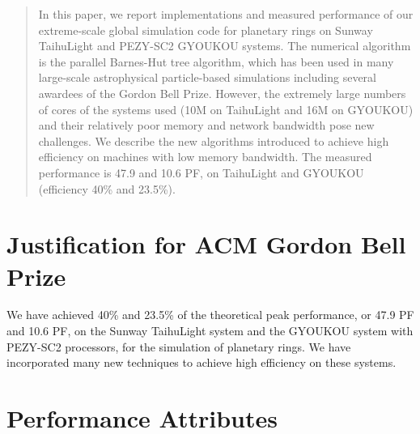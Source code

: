 \documentclass[conference]{IEEEtran}
\begin{document}
\maketitle

\begin{abstract}
  In this paper, we report implementations and measured performance
  of our extreme-scale global simulation code for planetary rings on
  Sunway TaihuLight and PEZY-SC2 GYOUKOU systems.
  The numerical algorithm is the parallel Barnes-Hut tree algorithm,
  which has been used in many large-scale astrophysical particle-based
  simulations including several awardees of the Gordon Bell
  Prize. However, the extremely large numbers of cores of the systems
  used (10M on TaihuLight and 16M on GYOUKOU)  and their relatively poor
  memory and network bandwidth pose new challenges. We describe the
  new algorithms introduced to achieve high efficiency on machines
  with low memory bandwidth.  The measured
  performance is 47.9 and 10.6 PF, on TaihuLight and GYOUKOU
  (efficiency  40\% and 23.5\%). 
\end{abstract}





%
\IEEEpeerreviewmaketitle

\section{Justification for ACM Gordon Bell Prize}


We have achieved 40\% and 23.5\% of the theoretical peak performance,
or 47.9 PF and 10.6 PF, on the Sunway TaihuLight system and
the GYOUKOU system with PEZY-SC2 processors, for the simulation of
planetary rings.  We have incorporated many new techniques to achieve
high efficiency on these systems.



\section{Performance Attributes}
\end{document}
